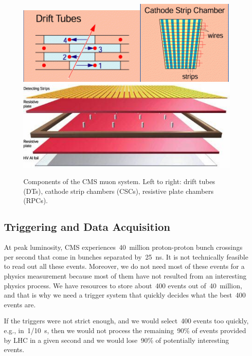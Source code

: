 \begin{figure}[htb]
  \begin{center}
    \includegraphics[height=2.5 cm]{../figs/Exp/muonSystem_driftTubes.png}\quad\includegraphics[height=2.5 cm]{../figs/Exp/muonSystem_CSC.png}\quad\includegraphics[height=2.5 cm]{../figs/Exp/muonSystem_RPC.png}
    \caption{Components of the CMS muon system. Left to right: drift tubes (DTs), cathode strip chambers (CSCs), resistive plate chambers (RPCs).}
    \label{fig:muonSystem}
  \end{center}
\end{figure}


\subsection{Triggering and Data Acquisition}

At peak luminosity, CMS experiences~40~million proton-proton bunch crossings per second that come in bunches separated by~25~ns. It is not technically feasible to read out all these events. Moreover, we do not need most of these events for a physics measurement because most of them have not resulted from an interesting physics process. We have resources to store about~400 events out of~40~million, and that is why we need a trigger system that quickly decides what the best~400 events are.


If the triggers were not strict enough, and we would select~400 events too quickly, e.g., in~1/10~s, then we would not process the remaining~90\% of events provided by LHC in a given second and we would lose~90\% of potentially interesting events.

